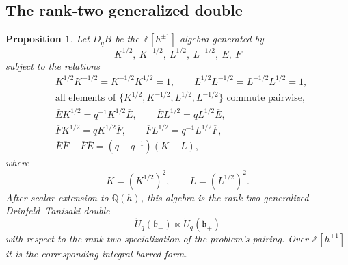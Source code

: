 \documentclass[12pt]{article}
\theoremstyle{plain}
\newtheorem{proposition}[theorem]{Proposition}
\theoremstyle{definition}
\numberwithin{equation}{section}
\newcommand{\Ring}{\mathbb{Z}[h^{\pm 1}]}
\newcommand{\Field}{\mathbb{Q}(h)}
\newcommand{\DqB}{D_qB}
\newcommand{\Khalf}{K^{1/2}}
\newcommand{\Kmh}{K^{-1/2}}
\newcommand{\Lhalf}{L^{1/2}}
\newcommand{\Lmh}{L^{-1/2}}
\newcommand{\Ebar}{\overline{E}}
\newcommand{\Fbar}{\overline{F}}
\newcommand{\bipr}{\bowtie}         %
\begin{document}
\subsection{The rank‑two generalized double}
\begin{proposition}\label{prop:rank-two-double}
Let \(\DqB\) be the \(\Ring\)-algebra generated by
\[
\Khalf,\ \Kmh,\ \Lhalf,\ \Lmh,\ \Ebar,\ \Fbar
\]
subject to the relations
\begin{align}
&\Khalf\Kmh=\Kmh\Khalf=1,
\qquad
\Lhalf\Lmh=\Lmh\Lhalf=1, \label{eq:D-torus-inv}\\
&\text{all elements of }\{\Khalf,\Kmh,\Lhalf,\Lmh\}\text{ commute pairwise}, \label{eq:D-torus-comm}\\
&\Ebar\Khalf=q^{-1}\Khalf\Ebar,
\qquad
\Ebar\Lhalf=q\Lhalf\Ebar, \label{eq:D-E-twist}\\
&\Fbar\Khalf=q\Khalf\Fbar,
\qquad
\Fbar\Lhalf=q^{-1}\Lhalf\Fbar, \label{eq:D-F-twist}\\
&\Ebar\Fbar-\Fbar\Ebar=(q-q^{-1})(K-L), \label{eq:D-comm}
\end{align}
where
\[
K=(\Khalf)^2,
\qquad
L=(\Lhalf)^2.
\]
After scalar extension to \(\Field\), this algebra is the rank-two generalized Drinfeld--Tanisaki double
\[
\check U_q(\mathfrak b_-)\bipr \check U_q(\mathfrak b_+)
\]
with respect to the rank-two specialization of the problem's pairing.  Over \(\Ring\) it is the corresponding integral barred form.
\end{proposition}
\end{document}
